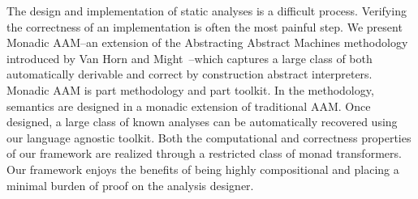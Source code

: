 The design and implementation of static analyses is a difficult process.
%
Verifying the correctness of an implementation is often the most painful step.
%
We present Monadic AAM--an extension of the Abstracting Abstract Machines
methodology introduced by Van Horn and Might~\cite{van-horn:2010:aam}--which
captures a large class of both automatically derivable and correct by
construction abstract interpreters.
%
Monadic AAM is part methodology and part toolkit.
%
In the methodology, semantics are designed in a monadic extension of
traditional AAM.
%
Once designed, a large class of known analyses can be automatically recovered
using our language agnostic toolkit.
%
Both the computational and correctness properties of our framework are realized
through a restricted class of monad transformers.
%
Our framework enjoys the benefits of being highly compositional and placing a
minimal burden of proof on the analysis designer.
